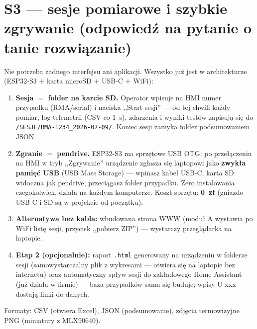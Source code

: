 \documentclass[11pt,a4paper]{article}
\begin{document}
\section{S3 --- sesje pomiarowe i szybkie zgrywanie (odpowiedź na pytanie o tanie rozwiązanie)}
Nie potrzeba żadnego interfejsu ani aplikacji. Wszystko już jest w architekturze (ESP32-S3
$+$ karta microSD $+$ USB-C $+$ WiFi):
\begin{enumerate}
\item \textbf{Sesja $=$ folder na karcie SD.} Operator wpisuje na HMI numer przypadku (RMA/serial)
i naciska ,,Start sesji'' --- od tej chwili każdy pomiar, log telemetrii (CSV co 1~s), zdarzenia
i wyniki testów zapisują się do \texttt{/SESJE/RMA-1234\_2026-07-09/}. Koniec sesji zamyka folder
podsumowaniem JSON.
\item \textbf{Zgranie $=$ pendrive.} ESP32-S3 ma sprzętowe USB OTG: po przełączeniu na HMI w tryb
,,Zgrywanie'' urządzenie zgłasza się laptopowi jako \textbf{zwykła pamięć USB} (USB Mass Storage)
--- wpinasz kabel USB-C, karta SD widoczna jak pendrive, przeciągasz folder przypadku. Zero
instalowania czegokolwiek, działa na każdym komputerze. Koszt sprzętu: \textbf{0~zł} (gniazdo
USB-C i SD są w projekcie od początku).
\item \textbf{Alternatywa bez kabla:} wbudowana strona WWW (moduł A wystawia po WiFi listę sesji,
przycisk ,,pobierz ZIP'') --- wystarczy przeglądarka na laptopie.
\item \textbf{Etap 2 (opcjonalnie):} raport \texttt{.html} generowany na urządzeniu w folderze
sesji (samowystarczalny plik z wykresami --- otwiera się na laptopie bez internetu) oraz
automatyczny spływ sesji do zakładowego Home Assistant (już działa w firmie) --- baza przypadków
sama się buduje; wpisy U-xxx dostają linki do danych.
\end{enumerate}
Formaty: CSV (otwiera Excel), JSON (podsumowanie), zdjęcia termowizyjne PNG (miniatury z MLX90640).
\end{document}
